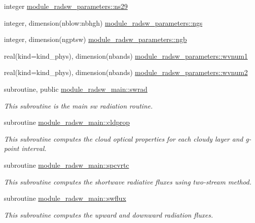 \begin{DoxyCompactItemize}
integer \hyperlink{group__module__radsw__main_gae966fc99ad683e9e0ee30f792db413fc}{module\+\_\+radsw\+\_\+parameters\+::ns29}
\item 
integer, dimension(nblow\+:nbhgh) \hyperlink{group__module__radsw__main_ga715ab3195493dff0639da443c21e4fb5}{module\+\_\+radsw\+\_\+parameters\+::ngs}
\item 
integer, dimension(ngptsw) \hyperlink{group__module__radsw__main_gafdd8496d7eaa017f7f1e08e998945c1e}{module\+\_\+radsw\+\_\+parameters\+::ngb}
\item 
real(kind=kind\+\_\+phys), dimension(nbands) \hyperlink{group__module__radsw__main_gadc7827bd2bed6502a0a60b40b8f1deeb}{module\+\_\+radsw\+\_\+parameters\+::wvnum1}
\item 
real(kind=kind\+\_\+phys), dimension(nbands) \hyperlink{group__module__radsw__main_ga88594ac7d3fbf13f2fdbac4b3b844d88}{module\+\_\+radsw\+\_\+parameters\+::wvnum2}
\end{DoxyCompactItemize}
\begin{DoxyCompactItemize}
\item 
subroutine, public \hyperlink{group__module__radsw__main_ga1186b2e2f7ebd5fb6dfbb43222d3ab3c}{module\+\_\+radsw\+\_\+main\+::swrad}
\begin{DoxyCompactList}\small\item\em This subroutine is the main sw radiation routine. \end{DoxyCompactList}\end{DoxyCompactItemize}
\begin{DoxyCompactItemize}
\item 
subroutine \hyperlink{group__module__radsw__main_ga1a3bb4385e7a610aa7eec9759383ffe9}{module\+\_\+radsw\+\_\+main\+::cldprop}
\begin{DoxyCompactList}\small\item\em This subroutine computes the cloud optical properties for each cloudy layer and g-\/point interval. \end{DoxyCompactList}\end{DoxyCompactItemize}
\begin{DoxyCompactItemize}
\item 
subroutine \hyperlink{group__module__radsw__main_gaed15bfde1b9f2286c58f6c807f8bf479}{module\+\_\+radsw\+\_\+main\+::spcvrtc}
\begin{DoxyCompactList}\small\item\em This subroutine computes the shortwave radiative fluxes using two-\/stream method. \end{DoxyCompactList}\end{DoxyCompactItemize}
\begin{DoxyCompactItemize}
\item 
subroutine \hyperlink{group__module__radsw__main_ga53ae1cb0229a048545027667adcc3cd7}{module\+\_\+radsw\+\_\+main\+::swflux}
\begin{DoxyCompactList}\small\item\em This subroutine computes the upward and downward radiation fluxes. \end{DoxyCompactList}\end{DoxyCompactItemize}



